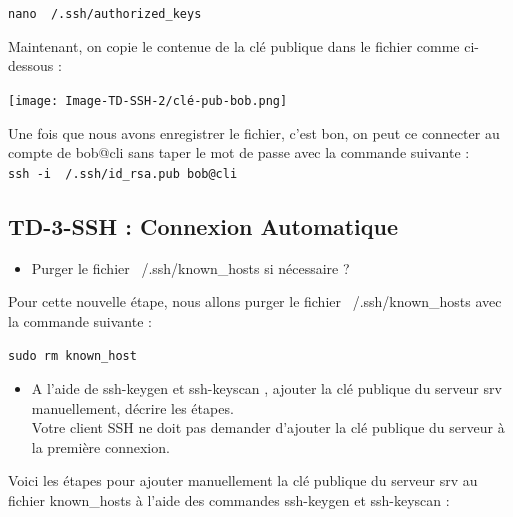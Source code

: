 \documentclass[12pt]{article}
\begin{document}
\texttt{nano ~/.ssh/authorized\_keys}

\vspace{0.3cm}

Maintenant, on copie le contenue de la clé publique dans le fichier comme ci-dessous  : 

\vspace{0.3cm}

\begin{center}
  \texttt{[image: Image-TD-SSH-2/clé-pub-bob.png]}
\end{center}

\vspace{0.3cm}

Une fois que nous avons enregistrer le fichier, c'est bon, on peut ce connecter au compte de bob@cli sans taper le mot de passe avec la commande suivante : \\  

\texttt{ssh -i ~/.ssh/id\_rsa.pub bob@cli}


\subsection{TD-3-SSH : Connexion Automatique}

\begin{itemize}
  \item Purger le fichier ~/.ssh/known\_hosts si nécessaire ?
\end{itemize}

\vspace{0.3cm}

Pour cette nouvelle étape, nous allons purger le fichier ~/.ssh/known\_hosts avec la commande suivante : 

\texttt{sudo rm known\_host}

\vspace{0.3cm}

\begin{itemize}
  \item A l'aide de ssh-keygen et ssh-keyscan , ajouter la clé publique du serveur srv manuellement, décrire les étapes. \\
  Votre client SSH ne doit pas demander d'ajouter la clé publique du serveur à la première connexion.
\end{itemize}

\vspace{0.3cm}

Voici les étapes pour ajouter manuellement la clé publique du serveur srv au fichier known\_hosts à l'aide des commandes ssh-keygen et ssh-keyscan :
\end{document}
